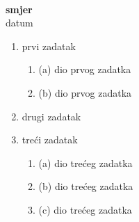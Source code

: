 \documentclass[a4paper,12pt]{article}
\begin{document}
\thispagestyle{empty}

\begin{center}
\\[2pt]
\textbf{smjer}\\[2pt]
datum
\end{center}

\vspace{10pt}
\renewcommand{\labelenumi}{\shadowbox{\arabic{enumi}.}}
\renewcommand{\labelenumii}{\doublebox{\alph{enumii}.}}

\begin{enumerate}

\item prvi zadatak
\begin{enumerate}
\item (a) dio prvog zadatka
\item (b) dio prvog zadatka
\end{enumerate}

\item drugi zadatak

\item tre\'ci zadatak
\begin{enumerate}
\item (a) dio tre\'ceg zadatka
\item (b) dio tre\'ceg zadatka
\item (c) dio tre\'ceg zadatka
\end{enumerate}


\end{enumerate}
\end{document}
